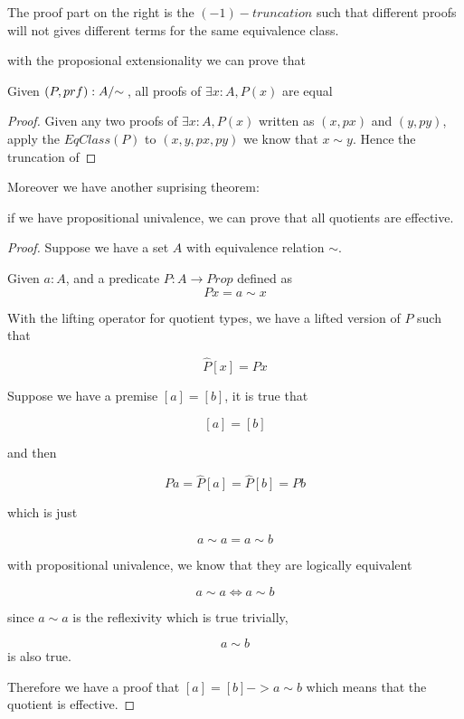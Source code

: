 The proof part on the right is the $(-1)-truncation$ such that
different proofs will not gives different terms for the same
equivalence class.


with the proposional extensionality we can prove that
\begin{theorem}
Given $(P , prf) : \qset{A}$, all proofs of $\exists x : A, P (x)$ are equal
\end{theorem}

\begin{proof}
Given any two proofs of $\exists x : A, P (x)$ written as $(x , px)$ and $(y
, py)$, apply the $EqClass(P)$ to $(x, y, px, py)$ we know that $x
\sim y$. Hence the truncation of 
\end{proof}












Moreover we have another suprising theorem:

\begin{theorem}
if we have propositional univalence, we can prove that all
quotients are effective.
\end{theorem}

\begin{proof}
Suppose we have a set $A$ with equivalence relation $\sim$.

Given $a : A$, and a predicate $P : A \rightarrow Prop$ defined as 
$$P x = a \sim x$$

With the lifting operator for quotient types,
we have a lifted version of $P$ such that

$$\hat{P} [ x ] =  P x$$

Suppose we have a premise $[ a ] = [ b ]$, it is true that

$$[ a ] = [ b ]$$

and then

$$P a = \hat{P} [ a ] = \hat{P} [ b ] = P b$$

which is just

$$a \sim a = a \sim b$$

with propositional univalence, we know that they are logically equivalent

$$a \sim a \iff a \sim b$$

since $a \sim a$ is the reflexivity which is true trivially,

$$ a \sim b$$ is also true.

Therefore we have a proof that $[ a ] = [ b ] -> a \sim b$ which means
that the quotient is effective.
\end{proof}


